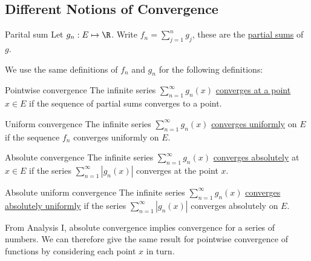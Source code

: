 \documentclass[../Main.tex]{subfiles}
\begin{document}
\subsection{Different Notions of Convergence}
\begin{definition}{Parital sum}
    Let $g_n : E \mapsto \R$. Write $f_n = \sum_{j = 1}^n g_j$, these are the \underline{partial sums} of $g$.
\end{definition}
We use the same definitions of $f_n$ and $g_n$ for the following definitions:
\begin{definition}{Pointwise convergence}
    The infinite series $\sum_{n = 1}^\infty g_n(x)$ \underline{converges at a point} $x \in E$ if the sequence of partial sums converges to a point.
\end{definition}
\begin{definition}{Uniform convergence}
    The infinite series $\sum_{n = 1}^\infty g_n(x)$ \underline{converges uniformly} on $E$ if the sequence $f_n$ converges uniformly on $E$.
\end{definition}
\begin{definition}{Absolute convergence}
    The infinite series $\sum_{n = 1}^\infty g_n(x)$ \underline{converges absolutely} at $x \in E$ if the series $\sum_{n = 1}^\infty |g_n(x)|$ converges at the point $x$.
\end{definition}
\begin{definition}{Absolute uniform convergence}
    The infinite series $\sum_{n = 1}^\infty g_n(x)$ \underline{converges absolutely uniformly} if the series $\sum_{n = 1}^\infty |g_n(x)|$ converges absolutely on $E$.
\end{definition}
From Analysis I, absolute convergence implies convergence for a series of numbers. We can therefore give the same result for pointwise convergence of functions by considering each point $x$ in turn.
\end{document}
